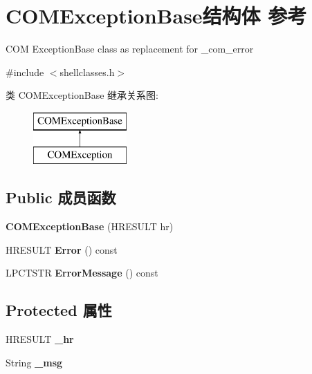 \hypertarget{struct_c_o_m_exception_base}{}\section{C\+O\+M\+Exception\+Base结构体 参考}
\label{struct_c_o_m_exception_base}


C\+OM Exception\+Base class as replacement for \+\_\+com\+\_\+error  




{\ttfamily \#include $<$shellclasses.\+h$>$}

类 C\+O\+M\+Exception\+Base 继承关系图\+:\begin{figure}[H]
\begin{center}
\leavevmode
\includegraphics[height=2.000000cm]{struct_c_o_m_exception_base}
\end{center}
\end{figure}
\subsection*{Public 成员函数}
\begin{DoxyCompactItemize}
\item 
\mbox{\label{struct_c_o_m_exception_base_ab0c859679d2a4f756ddc481f68621eea}} 
{\bfseries C\+O\+M\+Exception\+Base} (H\+R\+E\+S\+U\+LT hr)
\item 
\mbox{\label{struct_c_o_m_exception_base_ae6ef652bbd9c51ee0fe7c716cfee3425}} 
H\+R\+E\+S\+U\+LT {\bfseries Error} () const
\item 
\mbox{\label{struct_c_o_m_exception_base_aec05367d89ab0a06c9ba21cb9bae9699}} 
L\+P\+C\+T\+S\+TR {\bfseries Error\+Message} () const
\end{DoxyCompactItemize}
\subsection*{Protected 属性}
\begin{DoxyCompactItemize}
\item 
\mbox{\label{struct_c_o_m_exception_base_adef64968ac07bbff6fdfadc748be8a13}} 
H\+R\+E\+S\+U\+LT {\bfseries \+\_\+hr}
\item 
\mbox{\label{struct_c_o_m_exception_base_a68a5a1a96c8c1312d7e3b8d50068a572}} 
String {\bfseries \+\_\+msg}
\end{DoxyCompactItemize}


